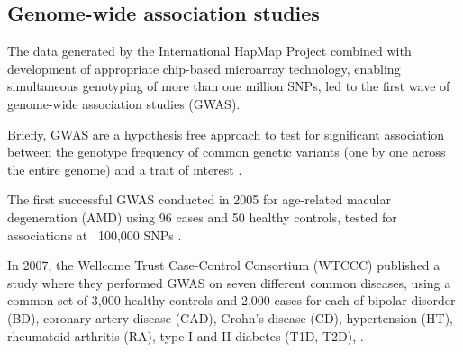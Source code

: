 
\subsection{Genome-wide association studies}

The data generated by the International HapMap Project combined with development of appropriate chip-based microarray technology, enabling simultaneous genotyping of more than one million SNPs, led to the first wave of genome-wide association studies (GWAS).

Briefly, GWAS are a hypothesis free approach to test for significant association between the genotype frequency of common genetic variants (one by one across the entire genome) and a trait of interest \cite{mccarthy2008genome}. 

The first successful GWAS conducted in 2005 for age-related macular degeneration (AMD) using 96 cases and 50 healthy controls, tested for associations at ~100,000 SNPs \cite{klein2005complement}. 

In 2007, the Wellcome Trust Case-Control Consortium (WTCCC) published a study where they performed GWAS on seven different common diseases, using a common set of 3,000 healthy controls and 2,000 cases for each of bipolar disorder (BD), coronary artery disease (CAD), Crohn's disease (CD), hypertension (HT), rheumatoid arthritis (RA), type I and II diabetes (T1D, T2D), \cite{wellcome2007genome}.\\ 








